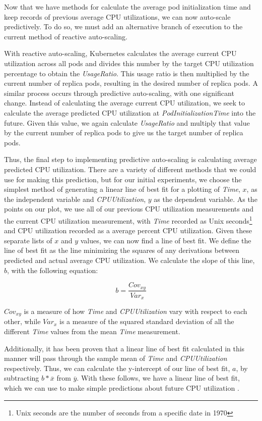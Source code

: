 Now that we have methods for calculate the average pod initialization time and
keep records of previous average CPU utilizations, we can now auto-scale
predictively. To do so, we must add an alternative branch of execution to the
current method of reactive auto-scaling.

With reactive auto-scaling, Kubernetes calculates the average current CPU utilization
across all pods and divides this number by the target CPU utilization
percentage to obtain the \textit{UsageRatio}. This usage ratio is then multiplied
by the current number of replica pods, resulting in the desired number of
replica pods. A similar process occurs through predictive auto-scaling, with one
significant change. Instead of calculating the average current CPU utilization,
we seek to calculate the average predicted CPU utilization at
\textit{PodInitializationTime} into the future. Given this value, we again
calculate \textit{UsageRatio} and multiply that value by the current number of
replica pods to give us the target number of replica pods.

Thus, the final step to implementing predictive auto-scaling is calculating
average predicted CPU utilization. There are a variety of different methods that
we could use for making this prediction, but for our initial experiments, we
choose the simplest method of generating a linear line of best fit for a
plotting of \textit{Time}, $x$, as the independent variable and
\textit{CPUUtilization}, $y$ as the dependent variable. As the points on our plot, we
use all of our previous CPU utilization measurements and the current CPU
utilization measurement, with \textit{Time}
recorded as Unix seconds\footnote{Unix seconds are the number of seconds from a
specific date in 1970} and CPU utilization recorded as a average percent CPU
utilization. Given these separate lists of $x$ and $y$ values, we can now find a
line of best fit. We define the line of best fit as the line minimizing the
squares of any derivations between predicted and actual average CPU utilization.
We calculate the slope of this line, $b$, with the following equation:

\[ b = \frac{Cov_{xy}}{Var_{x}}\]

$Cov_{xy}$ is a measure of how \textit{Time} and \textit{CPUUtilization} vary
with respect to each other, while $Var_{{x}}$ is a measure of the squared standard
deviation of all the different \textit{Time} values from the mean \textit{Time}
measurement.

Additionally, it has been proven that a linear line of best fit calculated in
this manner will pass through the sample mean of \textit{Time} and
\textit{CPUUtilization} respectively. Thus, we can calculate the y-intercept of
our line of best fit, $a$, by subtracting $b * \overline{x}$ from $\overline{y}$. With
these follows, we have a linear line of best fit, which we can use to make
simple predictions about future CPU utilization \cite{line-of-best-fit}.

